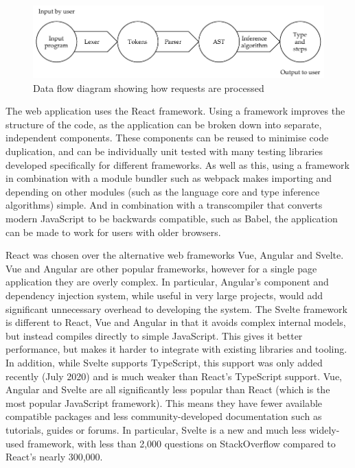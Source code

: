 \documentclass[a4paper,fleqn,oneside,12pt]{report}
\begin{document}
{\centering \begin{figure}[h!]
  \centering
  \includegraphics[width=\linewidth]{images/pipeline.pdf}
  \caption{Data flow diagram showing how requests are processed}
\end{figure} \par}
The web application uses the React framework. Using a framework improves the structure of the code, as the application can be broken down into separate, independent components. These components can be reused to minimise code duplication, and can be individually unit tested with many testing libraries developed specifically for different frameworks. As well as this, using a framework in combination with a module bundler such as webpack makes importing and depending on other modules (such as the language core and type inference algorithms) simple. And in combination with a transcompiler that converts modern JavaScript to be backwards compatible, such as Babel, the application can be made to work for users with older browsers.

React was chosen over the alternative web frameworks Vue, Angular and Svelte. Vue and Angular are other popular frameworks, however for a single page application they are overly complex. In particular, Angular's component and dependency injection system, while useful in very large projects, would add significant unnecessary overhead to developing the system. The Svelte framework is different to React, Vue and Angular in that it avoids complex internal models, but instead compiles directly to simple JavaScript. This gives it better performance, but makes it harder to integrate with existing libraries and tooling. In addition, while Svelte supports TypeScript, this support was only added recently (July 2020) and is much weaker than React’s TypeScript support. Vue, Angular and Svelte are all significantly less popular than React (which is the most popular JavaScript framework). This means they have fewer available compatible packages and less community-developed documentation such as tutorials, guides or forums. In particular, Svelte is a new and much less widely-used framework, with less than 2,000 questions on StackOverflow compared to React’s nearly 300,000.
\end{document}

